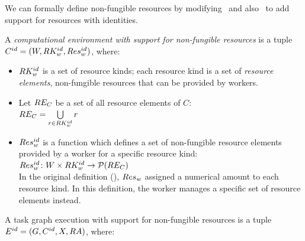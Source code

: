 We can formally define non-fungible resources by modifying~ and
also~ to add support for resources with identities.

\vspace{2mm} A \emph{computational environment with support for non-fungible resources} is a tuple
$C^{id} = (W, RK_w^{id}, Res_w^{id})$, where:
\begin{itemize}[itemsep=0pt]
	\item $RK_w^{id}$ is a set of resource kinds; each resource kind is a set of
	      \emph{resource elements}, non-fungible resources that can be provided by workers.
	\item Let $RE_C$ be a set of all resource elements of $C$: \\
	      $RE_C = \bigcup\limits_{r\in RK_w^{id}} r$
	\item $Res_w^{id}$ is a function which defines a set of non-fungible resource elements provided
	      by a worker for a specific resource kind: \\ $Res_w^{id}\colon W \times RK_w^{id} \rightarrow \mathcal{P}(RE_C)$ \vspace{2mm}\\ In the
	      original definition (), $Res_w$ assigned a numerical amount to
	      each resource kind. In this  definition, the worker manages a specific set of resource elements
	      instead.
\end{itemize}

\vspace{2mm} A task graph execution with support for non-fungible
resources is a tuple $E^{id} = (G, C^{id}, X,
	RA)$, where:

